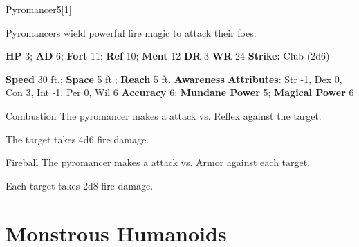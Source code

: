   \begin{monsection}{Pyromancer}{5}[1]
    \vspace{-1em}\vspace{-1em}
    \vspace{0em}

    
      Pyromancers wield powerful fire magic to attack their foes.
    

    \begin{spellcontent}
      \begin{spelltargetinginfo}
        \pari \textbf{HP} 3;
          \textbf{AD} 6;
          \textbf{Fort} 11;
          \textbf{Ref} 10;
          \textbf{Ment} 12
        \pari \textbf{DR} 3
        \pari \textbf{WR} 24
        \pari \textbf{Strike:}
            Club  (2d6)
      \end{spelltargetinginfo}
    \end{spellcontent}
    \begin{monsterfooter}
      \pari \textbf{Speed} 30 ft.;
        \textbf{Space} 5 ft.;
        \textbf{Reach} 5 ft.
      \pari \textbf{Awareness} 
      \pari \textbf{Attributes}:
        Str -1, Dex 0,
        Con 3, Int -1,
        Per 0, Wil 6
      \pari \textbf{Accuracy} 6;
        \textbf{Mundane Power} 5;
      \textbf{Magical Power} 6
    \end{monsterfooter}
  \end{monsection}
  \begin{freeability}{Combustion}
       The pyromancer makes a  attack
        vs. Reflex against the target.
    
    \hit The target takes 4d6 fire damage.
    \end{freeability}
  

    \begin{freeability}{Fireball}
       The pyromancer makes a  attack
        vs. Armor against each target.
    
    \hit Each target takes 2d8 fire damage.
    \end{freeability}
  
        \section{Monstrous Humanoids}
      
